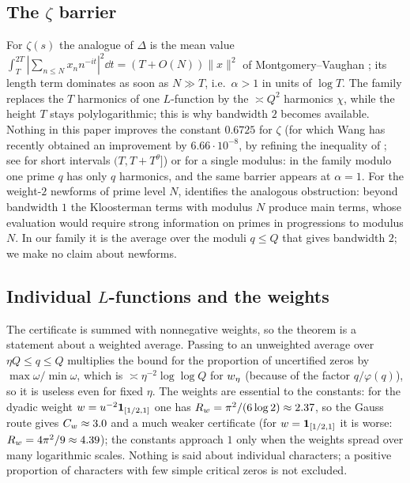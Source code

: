 \documentclass[11pt]{amsart}
\theoremstyle{definition}
\theoremstyle{remark}
\numberwithin{equation}{section}
\begin{document}
\subsection{The $\zeta$ barrier}\label{sec:zetabarrier}
For $\zeta(s)$ the analogue of $\Delta$ is the mean value $\int_T^{2T}|\sum_{n\le N}x_nn^{-it}|^2\dd t=(T+O(N))\|x\|^2$ of Montgomery--Vaughan \cite{MV74}; its length term dominates as soon as $N\gg T$, i.e.\ $\alpha>1$ in units of $\log T$. The family replaces the $T$ harmonics of one $L$-function by the $\asymp Q^2$ harmonics $\chi$, while the height $T$ stays polylogarithmic; this is why bandwidth $2$ becomes available. Nothing in this paper improves the constant $0.6725$ for $\zeta$ (for which Wang \cite{Wang26} has recently obtained an improvement by $6.66\cdot10^{-8}$, by refining the inequality of \cite{Lam26}; see \cite{Wang26b} for short intervals $(T,T+T^\theta]$) or for a single modulus: in \cite{HY26} the family modulo one prime $q$ has only $q$ harmonics, and the same barrier appears at $\alpha=1$. For the weight-$2$ newforms of prime level $N$, \cite{Fab26} identifies the analogous obstruction: beyond bandwidth $1$ the Kloosterman terms with modulus $N$ produce main terms, whose evaluation would require strong information on primes in progressions to modulus $N$. In our family it is the average over the moduli $q\le Q$ that gives bandwidth $2$; we make no claim about newforms.

\subsection{Individual $L$-functions and the weights}\label{sec:indiv}
The certificate is summed with nonnegative weights, so the theorem is a statement about a weighted average. Passing to an unweighted average over $\eta Q\le q\le Q$ multiplies the bound for the proportion of uncertified zeros by $\max\omega/\min\omega$, which is $\asymp\eta^{-2}\log\log Q$ for $w_\eta$ (because of the factor $q/\varphi(q)$), so it is useless even for fixed $\eta$. The weights are essential to the constants: for the dyadic weight $w=u^{-2}\mathbf 1_{[1/2,1]}$ one has $R_w=\pi^2/(6\log2)\approx2.37$, so the Gauss route gives $C_w\approx3.0$ and a much weaker certificate (for $w=\mathbf 1_{[1/2,1]}$ it is worse: $R_w=4\pi^2/9\approx4.39$); the constants approach $1$ only when the weights spread over many logarithmic scales. Nothing is said about individual characters; a positive proportion of characters with few simple critical zeros is not excluded.
\end{document}
